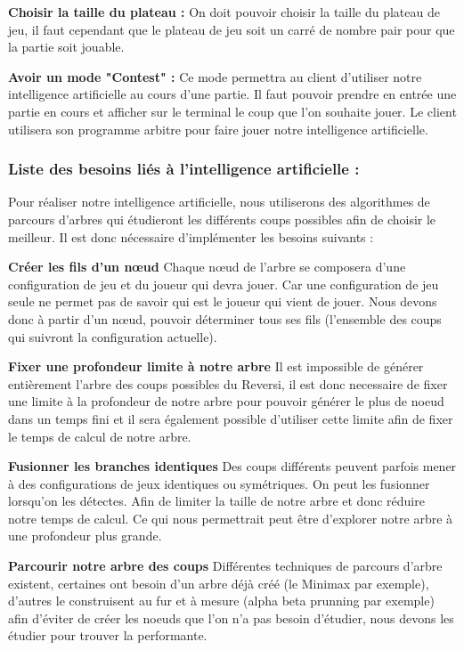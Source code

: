 \documentclass[12pt]{article}
\begin{document}
\textbf{Choisir la taille du plateau :}
On doit pouvoir choisir la taille du plateau de jeu, il faut cependant que le plateau de jeu soit un carré de nombre pair pour que la partie soit jouable.

\textbf{Avoir un mode "Contest" :} 
Ce mode permettra au client d'utiliser notre intelligence artificielle au cours d'une partie. Il faut pouvoir prendre en entrée une partie en cours et afficher sur le terminal le coup que l'on souhaite jouer. Le client utilisera son programme arbitre pour faire jouer notre intelligence artificielle.


\subsubsection{Liste des besoins liés à l'intelligence artificielle :}
Pour réaliser notre intelligence artificielle, nous utiliserons des algorithmes de parcours d'arbres\cite{arbre} qui étudieront les différents coups possibles afin de choisir le meilleur. Il est donc nécessaire d'implémenter les besoins suivants :

\textbf{Créer les fils d'un nœud}
Chaque nœud de l'arbre se composera d'une configuration de jeu et du joueur qui devra jouer. Car une configuration de jeu seule ne permet pas de savoir qui est le joueur qui vient de jouer. Nous devons donc à partir d'un nœud, pouvoir déterminer tous ses fils (l'ensemble des coups qui suivront la configuration actuelle).

\textbf{Fixer une profondeur limite à notre arbre}
Il est impossible de générer entièrement l'arbre des coups possibles du Reversi, il est donc necessaire de fixer une limite à la profondeur de notre arbre pour pouvoir générer le plus de noeud dans un temps fini et il sera également possible d'utiliser cette limite afin de fixer le temps de calcul de notre arbre.

\textbf{Fusionner les branches identiques}
Des coups différents peuvent parfois mener à des configurations de jeux identiques ou symétriques. On peut les fusionner lorsqu'on les détectes. Afin de limiter la taille de notre arbre et donc réduire notre temps de calcul. Ce qui nous permettrait peut être d'explorer notre arbre à une profondeur plus grande.

\textbf{Parcourir notre arbre des coups}
Différentes techniques de parcours d'arbre existent, certaines ont besoin d'un arbre déjà créé (le Minimax\cite{minimax} par exemple), d'autres le construisent au fur et à mesure (alpha beta prunning\cite{alpha-beta} par exemple) afin d'éviter de créer les noeuds que l'on n'a pas besoin d'étudier, nous devons les étudier pour trouver la performante.
\end{document}
